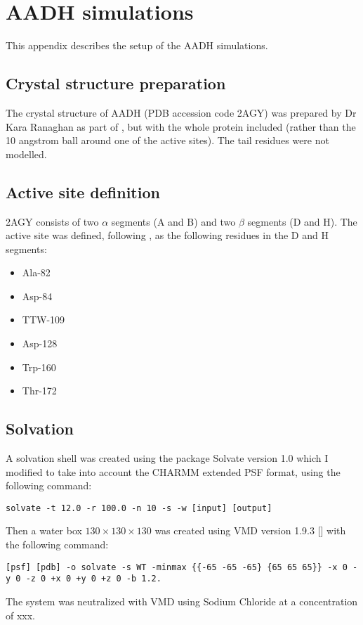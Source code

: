 %
%

\chapter{AADH simulations}
\label{app:aadh}

This appendix describes the setup of the AADH simulations. 

\section{Crystal structure preparation}
The crystal structure of AADH (PDB accession code 2AGY) was prepared by Dr Kara Ranaghan as part of \cite{masgrau_atomic_2006}, but with the whole protein included (rather than the 10 angstrom ball around one of the active sites). The tail residues were not modelled. 

\section{Active site definition}
2AGY consists of two $\alpha$ segments (A and B) and two $\beta$ segments (D and H). The active site was defined, following \cite{ranaghan_ab_2017}, as the following residues in the D and H segments: 
\begin{itemize}
    \item Ala-82
    \item Asp-84
    \item TTW-109
    \item Asp-128
    \item Trp-160
    \item Thr-172
\end{itemize}


\section{Solvation}
A solvation shell was created using the package Solvate version 1.0 \cite{grubmuller1996solvate} which I modified to take into account the CHARMM extended PSF format, using the following command:
\begin{lstlisting}
solvate -t 12.0 -r 100.0 -n 10 -s -w [input] [output]
\end{lstlisting}
Then a water box $130 \times 130 \times 130  $  was created using VMD version 1.9.3 [] with the following command: 
\begin{lstlisting}
[psf] [pdb] -o solvate -s WT -minmax {{-65 -65 -65} {65 65 65}} -x 0 -y 0 -z 0 +x 0 +y 0 +z 0 -b 1.2.
\end{lstlisting}
The system was neutralized  with VMD using Sodium Chloride at a concentration of xxx. 

